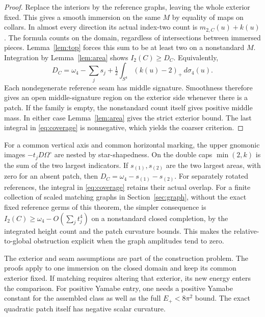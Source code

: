 \documentclass[11pt,letterpaper]{article}
\numberwithin{equation}{section}
\theoremstyle{definition}
\begin{document}
\begin{proof}
Replace the interiors by the reference graphs, leaving the
whole exterior fixed. This gives a smooth immersion on the
same \(M\) by equality of maps on collars. In almost every
direction its actual index-two count is \(m_{2,C}(u)+k(u)\).
The formula counts on the domain, regardless of intersections
between immersed pieces. Lemma~\ref{lem:top} forces this sum
to be at least two on a nonstandard \(M\). Integration by
Lemma~\ref{lem:area} shows \(I_2(C)\ge D_C\). Equivalently,
\begin{equation}\label{eq:coverage}
 D_C=\omega_4-\sum_j s_j+
                 \tfrac12\int_{S^4}(k(u)-2)_+\,d\sigma_4(u).
\end{equation}
Each nondegenerate reference seam has middle signature.
Smoothness therefore gives an open middle-signature region on
the exterior side whenever there is a patch. If the family is
empty, the nonstandard count itself gives positive middle
mass. In either case Lemma~\ref{lem:area} gives the strict
exterior bound. The last integral in \eqref{eq:coverage} is
nonnegative, which yields the coarser criterion.
\end{proof}

For a common vertical axis and common horizontal marking,
the upper gnomonic images \(-t_jD\Omega^\circ\) are
nested by star-shapedness. On the double caps
\(\min(2,k)\) is the sum of the two largest indicators.
If \(s_{(1)},s_{(2)}\) are the two largest areas, with zero
for an absent patch, then \(D_C=\omega_4-s_{(1)}-s_{(2)}\).
For separately rotated references, the integral in
\eqref{eq:coverage} retains their actual overlap. For
a finite collection of scaled matching graphs in
Section~\ref{sec:graph}, without the exact fixed reference germs
of this theorem, the simpler consequence is
\(I_2(C)\ge\omega_4-O(\sum_j t_j^4)\) on a nonstandard
closed completion, by the integrated height count and the
patch curvature bounds. This makes the relative-to-global
obstruction explicit when the graph amplitudes tend to zero.

The exterior and seam assumptions are part of the construction
problem. The proofs apply to one immersion on the closed
domain and keep its common exterior fixed. If matching requires
altering that exterior, its new energy enters the comparison.
For positive Yamabe entry, one needs a positive Yamabe constant
for the assembled class as well as the full \(E_+<8\pi^2\)
bound. The exact quadratic patch itself has negative scalar
curvature.
\end{document}
